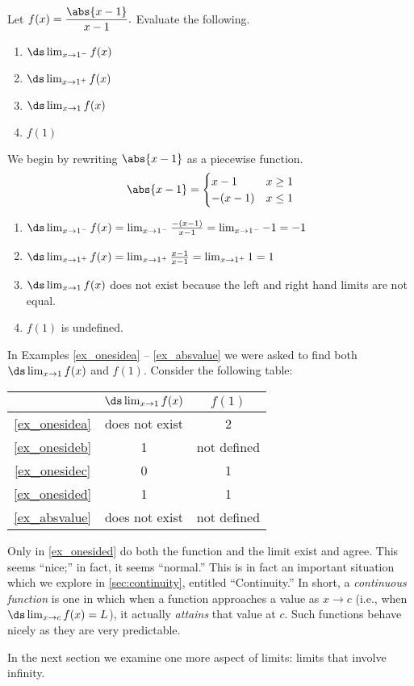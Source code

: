 \begin{example}\label{ex_absvalue}%
Let $f(x) =\dfrac{\abs{x-1}}{x-1}.$ Evaluate the following.
\begin{multicols}{2}
	\begin{enumerate}
		\item	$\ds \lim_{x\to 1^-} f(x)$
		\item	$\ds \lim_{x\to 1^+} f(x)$
		\item	$\ds \lim_{x\to 1} f(x)$
		\item	$f(1)$
	\end{enumerate}
\end{multicols}
\solution
We begin by rewriting $\abs{x-1}$ as a piecewise function.
\[\abs{x-1}=\begin{cases}x-1 & x\geq 1 \\ -(x-1) & x\leq 1\end{cases}\]
\begin{enumerate}
\item	$\ds \lim_{x\to 1^-} f(x)=\lim_{x\to 1^-}\frac{-(x-1)}{x-1}=\lim_{x\to 1^-}-1=-1$
\item	$\ds \lim_{x\to 1^+} f(x)=\lim_{x\to 1^+}\frac{x-1}{x-1}=\lim_{x\to 1^+}1=1$
\item 	$\ds \lim_{x\to 1} f(x)$ does not exist because the left and right hand limits are not equal.
\item $f(1)$ is undefined.
\end{enumerate}
\end{example}

In Examples \ref{ex_onesidea} -- \ref{ex_absvalue} we were asked to find both $\ds \lim_{x\to 1}f(x)$ and $f(1)$. Consider the following table:
\begin{center}
\begin{tabular}{ c c c }
 & $\ds \lim_{x\to 1}f(x)$ & $f(1)$ \\ \midrule
\autoref{ex_onesidea} & does not exist & 2 \\
\autoref{ex_onesideb} & 1 & not defined \\
\autoref{ex_onesidec} & 0 & 1 \\
\autoref{ex_onesided} & 1 & 1 \\
\autoref{ex_absvalue} & does not exist & not defined
\end{tabular}
\end{center}

Only in \autoref{ex_onesided} do both the function and the limit exist and agree. This seems ``nice;'' in fact, it seems ``normal.'' This is in fact an important situation which we explore in \autoref{sec:continuity}, entitled ``Continuity.'' In short, a \emph{continuous function} is one in which when a function approaches a value as $x\rightarrow c$ (i.e., when $\ds \lim_{x\to c} f(x) = L$), it actually \emph{attains} that value at $c$. Such functions behave nicely as they are very predictable.

In the next section we examine one more aspect of limits: limits that involve infinity.

